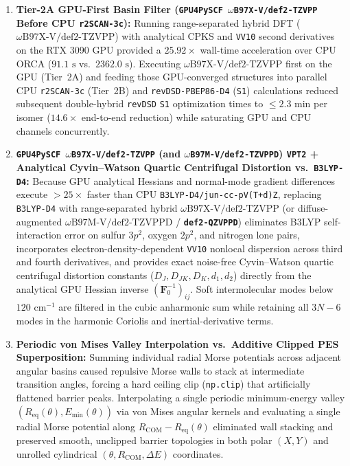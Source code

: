 \documentclass[journal=jpclcd,manuscript=article]{achemso}
\begin{document}
\begin{enumerate}
  \item \textbf{Tier-2A GPU-First Basin Filter (\texttt{GPU4PySCF $\omega$B97X-V/def2-TZVPP} Before CPU \texttt{r2SCAN-3c}):} Running range-separated hybrid DFT ($\omega\text{B97X-V/def2-TZVPP}$) with analytical CPKS and \texttt{VV10} second derivatives on the RTX 3090 GPU provided a $25.92\times$ wall-time acceleration over CPU ORCA ($91.1\text{ s}$ vs.\ $2362.0\text{ s}$). Executing $\omega\text{B97X-V/def2-TZVPP}$ first on the GPU (Tier~2A) and feeding those GPU-converged structures into parallel CPU \texttt{r2SCAN-3c} (Tier~2B) and \texttt{revDSD-PBEP86-D4} (\texttt{S1}) calculations reduced subsequent double-hybrid \texttt{revDSD} \texttt{S1} optimization times to $\le 2.3\text{ min}$ per isomer ($14.6\times$ end-to-end reduction) while saturating GPU and CPU channels concurrently.
  \item \textbf{\texttt{GPU4PySCF $\omega$B97X-V/def2-TZVPP} (and \texttt{$\omega$B97M-V/def2-TZVPPD}) \texttt{VPT2} + Analytical Cyvin--Watson Quartic Centrifugal Distortion vs.\ \texttt{B3LYP-D4}:} Because GPU analytical Hessians and normal-mode gradient differences execute $>25\times$ faster than CPU \texttt{B3LYP-D4/jun-cc-pV(T+d)Z}, replacing \texttt{B3LYP-D4} with range-separated hybrid \textbf{$\omega\text{B97X-V/def2-TZVPP}$} (or diffuse-augmented \textbf{$\omega\text{B97M-V/def2-TZVPPD}$} / \textbf{\texttt{def2-QZVPPD}}) \cite{Mardirossian2014, Mardirossian2016, Rappoport2010} eliminates B3LYP self-interaction error on sulfur $3p^2$, oxygen $2p^2$, and nitrogen lone pairs, incorporates electron-density-dependent \texttt{VV10} nonlocal dispersion across third and fourth derivatives, and provides exact noise-free Cyvin--Watson quartic centrifugal distortion constants ($D_J, D_{JK}, D_K, d_1, d_2$) directly from the analytical GPU Hessian inverse $(\mathbf{F}_0^{-1})_{ij}$. Soft intermolecular modes below $120\text{ cm}^{-1}$ are filtered in the cubic anharmonic sum while retaining all $3N-6$ modes in the harmonic Coriolis and inertial-derivative terms.
  \item \textbf{Periodic von Mises Valley Interpolation vs.\ Additive Clipped PES Superposition:} Summing individual radial Morse potentials across adjacent angular basins caused repulsive Morse walls to stack at intermediate transition angles, forcing a hard ceiling clip (\texttt{np.clip}) that artificially flattened barrier peaks. Interpolating a single periodic minimum-energy valley $(R_{\mathrm{eq}}(\theta), E_{\mathrm{min}}(\theta))$ via von Mises angular kernels and evaluating a single radial Morse potential along $R_{\mathrm{COM}} - R_{\mathrm{eq}}(\theta)$ eliminated wall stacking and preserved smooth, unclipped barrier topologies in both polar $(X,Y)$ and unrolled cylindrical $(\theta, R_{\mathrm{COM}}, \Delta E)$ coordinates.
\end{enumerate}
\end{document}
